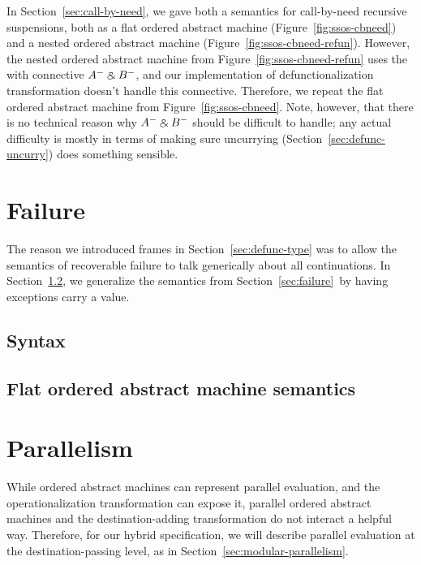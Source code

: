 In Section~\ref{sec:call-by-need}, we gave both a semantics for
call-by-need recursive suspensions, both as a flat ordered abstract
machine (Figure~\ref{fig:ssos-cbneed}) and a nested ordered abstract
machine (Figure~\ref{fig:ssos-cbneed-refun}). However, the nested
ordered abstract machine from Figure~\ref{fig:ssos-cbneed-refun} uses
the with connective $A^- \mathbin{\binampersand} B^-$, and our implementation of
defunctionalization transformation doesn't handle this connective.
Therefore, we repeat the flat ordered abstract machine from
Figure~\ref{fig:ssos-cbneed}.  Note, however, that there is no
technical reason why $A^- \mathbin{\binampersand} B^-$ should be difficult to handle;
any actual difficulty is mostly in terms of making sure uncurrying
(Section~\ref{sec:defunc-uncurry}) does something sensible.

\bigskip
{}

\section{Failure}

The reason we introduced frames in Section~\ref{sec:defunc-type} was
to allow the semantics of recoverable failure to talk generically
about all continuations. In Section~\ref{sec:compose-control}, we
generalize the semantics from Section~\ref{sec:failure}~by having exceptions
carry a value.

\subsection{Syntax}


\subsection{Flat ordered abstract machine semantics}
\label{sec:compose-control}


\section{Parallelism}

While ordered abstract machines can represent parallel evaluation, and
the operationalization transformation can expose it, parallel ordered
abstract machines and the destination-adding transformation do not
interact a helpful way. Therefore, for our hybrid specification,
we will describe parallel evaluation at the destination-passing 
level, as in Section~\ref{sec:modular-parallelism}.

